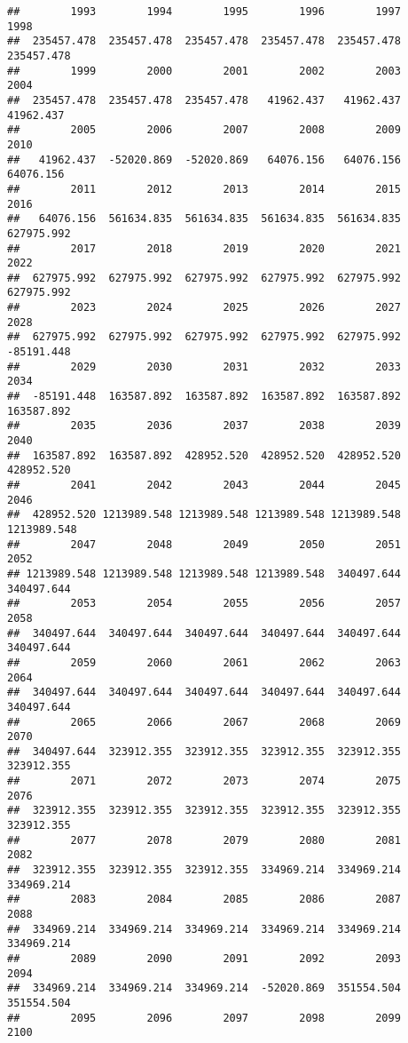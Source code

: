 \documentclass[
]{book}
\begin{document}
\begin{verbatim}
##        1993        1994        1995        1996        1997        1998 
##  235457.478  235457.478  235457.478  235457.478  235457.478  235457.478 
##        1999        2000        2001        2002        2003        2004 
##  235457.478  235457.478  235457.478   41962.437   41962.437   41962.437 
##        2005        2006        2007        2008        2009        2010 
##   41962.437  -52020.869  -52020.869   64076.156   64076.156   64076.156 
##        2011        2012        2013        2014        2015        2016 
##   64076.156  561634.835  561634.835  561634.835  561634.835  627975.992 
##        2017        2018        2019        2020        2021        2022 
##  627975.992  627975.992  627975.992  627975.992  627975.992  627975.992 
##        2023        2024        2025        2026        2027        2028 
##  627975.992  627975.992  627975.992  627975.992  627975.992  -85191.448 
##        2029        2030        2031        2032        2033        2034 
##  -85191.448  163587.892  163587.892  163587.892  163587.892  163587.892 
##        2035        2036        2037        2038        2039        2040 
##  163587.892  163587.892  428952.520  428952.520  428952.520  428952.520 
##        2041        2042        2043        2044        2045        2046 
##  428952.520 1213989.548 1213989.548 1213989.548 1213989.548 1213989.548 
##        2047        2048        2049        2050        2051        2052 
## 1213989.548 1213989.548 1213989.548 1213989.548  340497.644  340497.644 
##        2053        2054        2055        2056        2057        2058 
##  340497.644  340497.644  340497.644  340497.644  340497.644  340497.644 
##        2059        2060        2061        2062        2063        2064 
##  340497.644  340497.644  340497.644  340497.644  340497.644  340497.644 
##        2065        2066        2067        2068        2069        2070 
##  340497.644  323912.355  323912.355  323912.355  323912.355  323912.355 
##        2071        2072        2073        2074        2075        2076 
##  323912.355  323912.355  323912.355  323912.355  323912.355  323912.355 
##        2077        2078        2079        2080        2081        2082 
##  323912.355  323912.355  323912.355  334969.214  334969.214  334969.214 
##        2083        2084        2085        2086        2087        2088 
##  334969.214  334969.214  334969.214  334969.214  334969.214  334969.214 
##        2089        2090        2091        2092        2093        2094 
##  334969.214  334969.214  334969.214  -52020.869  351554.504  351554.504 
##        2095        2096        2097        2098        2099        2100 

\end{verbatim}
\end{document}
